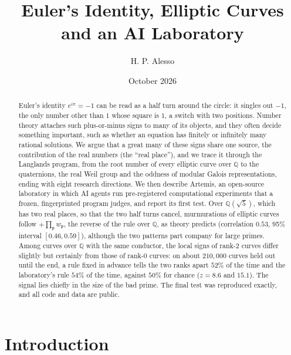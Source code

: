 \documentclass[11pt]{amsart}
\numberwithin{equation}{section}
\newcommand{\Q}{\mathbb{Q}}
\newcommand{\Kfield}{\Q(\sqrt{5})}
\begin{document}
\title{Euler's Identity, Elliptic Curves and an AI Laboratory}

\author{H. P. Alesso}
\address{AI HIVE}

\date{October 2026}

\begin{abstract}
Euler's identity $e^{i\pi}=-1$ can be read as a half turn around the circle: it singles out $-1$, the only number other than $1$ whose square is $1$, a switch with two positions. Number theory attaches such plus-or-minus signs to many of its objects, and they often decide something important, such as whether an equation has finitely or infinitely many rational solutions. We argue that a great many of these signs share one source, the contribution of the real numbers (the ``real place''), and we trace it through the Langlands program, from the root number of every elliptic curve over $\Q$ to the quaternions, the real Weil group and the oddness of modular Galois representations, ending with eight research directions. We then describe Artemis, an open-source laboratory in which AI agents run pre-registered computational experiments that a frozen, fingerprinted program judges, and report its first test. Over $\Kfield$, which has two real places, so that the two half turns cancel, murmurations of elliptic curves follow $+\prod_{\mathfrak p}w_{\mathfrak p}$, the reverse of the rule over $\Q$, as theory predicts (correlation $0.53$, 95\% interval $[0.46,0.59]$), although the two patterns part company for large primes. Among curves over $\Q$ with the same conductor, the local signs of rank-$2$ curves differ slightly but certainly from those of rank-$0$ curves: on about $210{,}000$ curves held out until the end, a rule fixed in advance tells the two ranks apart $52\%$ of the time and the laboratory's rule $54\%$ of the time, against $50\%$ for chance ($z=8.6$ and $15.1$). The signal lies chiefly in the size of the bad prime. The final test was reproduced exactly, and all code and data are public.
\end{abstract}

\maketitle

\section{Introduction}\label{sec:intro}
\end{document}
